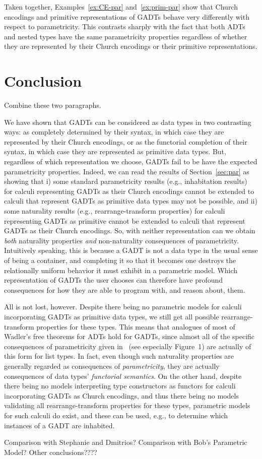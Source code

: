 \documentclass[acmsmall,screen,review,anonymous]{acmart}
\theoremstyle{definition}
\begin{document}
Taken together, Examples~\ref{ex:CE-par} and~\ref{ex:prim-par} show
that Church encodings and primitive representations of GADTs behave
very differently with respect to parametricity.  This contrasts
sharply with the fact that both ADTs and nested types have the same
parametricity properties regardless of whether they are represented by
their Church encodings or their primitive
representations. 

\section{Conclusion}

{\color{blue} Combine these two paragraphs.}

We have shown that GADTs can be considered as data types in two
contrasting ways: as completely determined by their syntax, in which
case they are represented by their Church encodings, or as the
functorial completion of their syntax, in which case they are
represented as primitive data types.  But, regardless of which
representation we choose, GADTs fail to be have the expected
parametricity properties. Indeed, we can read the results of
Section~\ref{sec:par} as showing that i) some standard parametricity
results (e.g., inhabitation results) for calculi representing GADTs as
their Church encodings cannot be extended to calculi that represent
GADTs as primitive data types may not be possible, and ii) some
naturality results (e.g., rearrange-transform properties) for calculi
representing GADTs as primitive cannot be extended to calculi that
represent GADTs as their Church encodings. So, with neither
representation can we obtain {\em both} naturality properties {\em
  and} non-naturality consequences of parametricity. Intuitively
speaking, this is because a GADT is not a data type in the usual sense
of being a container, and completing it so that it becomes one
destroys the relationally uniform behavior it must exhibit in a
parametric model. Which representation of GADTs the user chooses can
therefore have profound consequences for how they are able to program
with, and reason about, them.

All is not lost, however. Despite there being no parametric models for
calculi incorporating GADTs as primitive data types, we still get all
possible rearrange-transform properties for these types. This means
that analogues of most of Wadler's free theorems for ADTs hold for
GADTs, since almost all of the specific consequences of parametricity
given in~\cite{wad89} (see especially Figure~1) are actually of this
form for list types. In fact, even though such naturality properties
are generally regarded as consequences of {\em parametricity}, they
are actually consequences of data types' {\em functorial semantics}.
On the other hand, despite there being no models interpreting type
constructors as functors for calculi incorporating GADTs as Church
encodings, and thus there being no models validating all
rearrange-transform properties for these types, parametric models for
such calculi do exist, and these can be used, e.g., to determine which
instances of a GADT are inhabited.

{\color{blue} Comparison with Stephanie and Dmitrios? Comparison with
  Bob's Parametric Model? Other conclusions????} 


\end{document}

